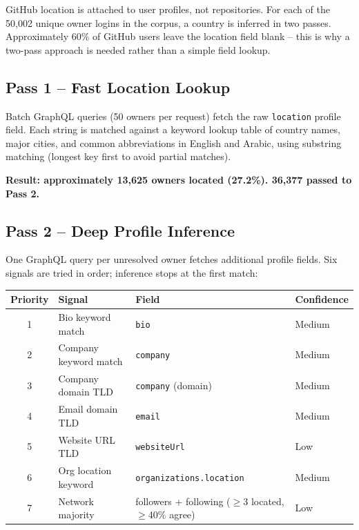 \documentclass[12pt,a4paper]{article}
\begin{document}
GitHub location is attached to user profiles, not repositories. For each of the
50,002 unique owner logins in the corpus, a country is inferred in two passes.
Approximately 60\% of GitHub users leave the location field blank -- this is why
a two-pass approach is needed rather than a simple field lookup.

\subsection{Pass 1 -- Fast Location Lookup}

Batch GraphQL queries (50 owners per request) fetch the raw \texttt{location} profile
field. Each string is matched against a keyword lookup table of country names, major
cities, and common abbreviations in English and Arabic, using substring matching
(longest key first to avoid partial matches).

\medskip
\noindent\textbf{Result: approximately 13,625 owners located (27.2\%). 36,377 passed to Pass 2.}

\subsection{Pass 2 -- Deep Profile Inference}

One GraphQL query per unresolved owner fetches additional profile fields. Six signals
are tried in order; inference stops at the first match:

\begin{table}[h]
\centering
\begin{tabular}{@{}clll@{}}
\toprule
Priority & Signal & Field & Confidence \\
\midrule
1 & Bio keyword match      & \texttt{bio}                  & Medium \\
2 & Company keyword match  & \texttt{company}              & Medium \\
3 & Company domain TLD     & \texttt{company} (domain)     & Medium \\
4 & Email domain TLD       & \texttt{email}                & Medium \\
5 & Website URL TLD        & \texttt{websiteUrl}           & Low \\
6 & Org location keyword   & \texttt{organizations.location} & Medium \\
7 & Network majority       & followers + following ($\geq$3 located, $\geq$40\% agree) & Low \\
\bottomrule
\end{tabular}
\end{table}
\end{document}
